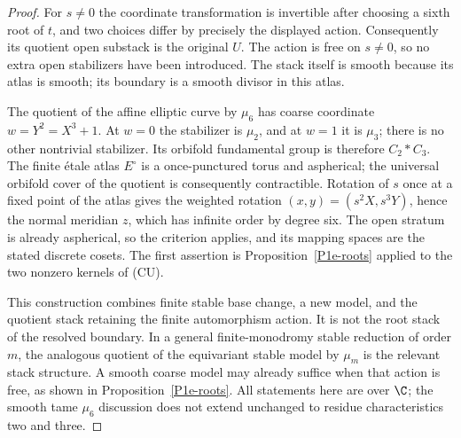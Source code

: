 \begin{proof}
For $s\ne0$ the coordinate transformation is invertible after choosing a sixth
root of $t$, and two choices differ by precisely the displayed action.
Consequently its quotient open substack is the original $U$.
The action is free on $s\ne0$, so no extra open stabilizers have been introduced.
The stack itself is smooth because its atlas is smooth; its boundary is a
smooth divisor in this atlas.

The quotient of the affine elliptic curve by $\mu_6$ has coarse coordinate
$w=Y^2=X^3+1$.  At $w=0$ the stabilizer is $\mu_2$, and at $w=1$ it is
$\mu_3$; there is no other nontrivial stabilizer.  Its orbifold fundamental
group is therefore $C_2*C_3$.  The finite \'etale atlas $E^\circ$ is a
once-punctured torus and aspherical; the universal orbifold cover of the
quotient is consequently contractible.  Rotation of $s$ once at a fixed
point of the atlas gives the weighted rotation $(x,y)=(s^2X,s^3Y)$, hence the
normal meridian $z$, which has infinite order by degree six.  The open stratum
is already aspherical, so the criterion applies, and its mapping spaces are
the stated discrete cosets.  The first assertion is
Proposition~\ref{P1e-roots} applied to the two nonzero kernels of (CU).

This construction combines finite stable base change, a new model, and the
quotient stack retaining the finite automorphism action.  It is not the root
stack of the resolved boundary.  In a general finite-monodromy stable
reduction of order $m$, the analogous quotient of the equivariant stable model
by $\mu_m$ is the relevant stack structure.  A smooth coarse model may already
suffice when that action is free, as shown in Proposition~\ref{P1e-roots}.
All statements here are over $\C$; the smooth tame $\mu_6$ discussion does not
extend unchanged to residue characteristics two and three.
\end{proof}
